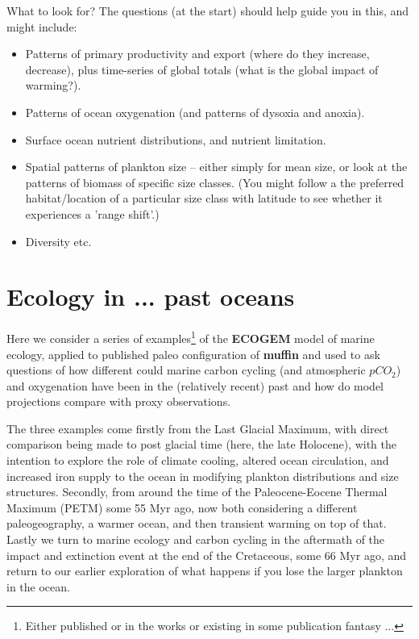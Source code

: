 \documentclass[11pt,fleqn]{book} %
\begin{document}
\vspace{1mm}
What to look for? The questions (at the start) should help guide you in this, and might include:

\vspace{1mm}
\begin{itemize}[noitemsep]
\setlength{\itemindent}{.2in}
\item Patterns of primary productivity and export (where do they increase, decrease), plus time-series of global totals (what is the global impact of warming?).
\item Patterns of ocean oxygenation (and patterns of dysoxia and anoxia).
\item Surface ocean nutrient distributions, and nutrient limitation.
\item Spatial patterns of plankton size -- either simply for mean size, or look at the patterns of biomass of specific size classes. (You might follow a the preferred habitat/location of a particular size class with latitude to see whether it experiences a 'range shift'.)
\item Diversity etc.
\end{itemize}



\newpage


\section{Ecology in ... past oceans}

Here we consider a series of examples\footnote{Either published or in the works or existing in some publication fantasy ...} of the \textbf{ECOGEM} model of marine ecology, applied to published paleo configuration of \textbf{muffin} and used to ask questions of how different could marine carbon cycling (and atmospheric \(pCO_{2}\)) and oxygenation have been in the (relatively recent) past and how do model projections compare with proxy observations.

The three examples come firstly from the Last Glacial Maximum, with direct comparison being made to post glacial time (here, the late Holocene), with the intention to explore the role of climate cooling, altered ocean circulation, and increased iron supply to the ocean in modifying plankton distributions and size structures. Secondly, from around the time of the Paleocene-Eocene Thermal Maximum (PETM) some 55 Myr ago, now both considering a different paleogeography, a warmer ocean, and then transient warming on top of that. Lastly we turn to marine ecology and carbon cycling in the aftermath of the impact and extinction event at the end of the Cretaceous, some 66 Myr ago, and return to our earlier exploration of what happens if you lose the larger plankton in the ocean.
\end{document}
